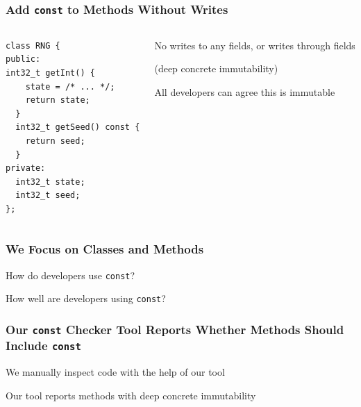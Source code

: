 \documentclass[aspectratio=169]{beamer}
\begin{document}
  \begin{frame}[fragile]
    \frametitle{Add \texttt{const} to Methods Without Writes}

    \begin{columns}
      \begin{column}{0.4\textwidth}
        \begin{lstlisting}
class RNG {
public:
int32_t getInt() {
    state = /* ... */;
    return state;
  }
  int32_t getSeed() const {
    return seed;
  }
private:
  int32_t state;
  int32_t seed;
};
        \end{lstlisting}
      \end{column}
      \begin{column}{0.5\textwidth}
        No writes to any fields, or writes through fields

        (deep concrete immutability)

        \vspace{1em}

        All developers can agree this is immutable

        \vspace{4em}

      \end{column}
    \end{columns}
  \end{frame}

  \begin{frame}
    \frametitle{We Focus on Classes and Methods}

    How do developers use \texttt{const}?

    \vspace{2em}

    How well are developers using \texttt{const}?
  \end{frame}

  \begin{frame}
    \frametitle{Our \texttt{const} Checker Tool Reports Whether Methods Should
                Include \texttt{const}}

    We manually inspect code with the help of our tool

    \vspace{2em}

    Our tool reports methods with deep concrete immutability
  \end{frame}
\end{document}
